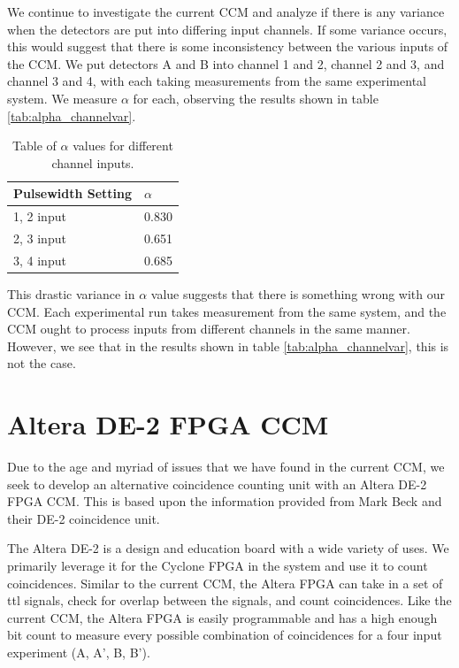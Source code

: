 \documentclass[letterpaper, 11 pt]{article}
\begin{document}
We continue to investigate the current CCM and analyze if there is any variance when the detectors
are put into differing input channels. If some variance occurs, this would suggest that there is some
inconsistency between the various inputs of the CCM. We put detectors A and B into channel 1 and 2,
channel 2 and 3, and channel 3 and 4, with each taking measurements from the same experimental system.
We measure $\alpha$ for each, observing the results shown in table \ref{tab:alpha_channelvar}.
\begin{table}[H]
    \centering
    \begin{tabular}{|l|l|}
    \hline
    \textbf{Pulsewidth Setting} & \textbf{$\alpha$} \\ \hline
    1, 2 input        & 0.830                   \\ \hline
    2, 3 input        & 0.651                   \\ \hline
    3, 4 input        & 0.685                   \\ \hline
    \end{tabular}
    \caption{Table of $\alpha$ values for different channel inputs.}
\end{table}\label{tab:alpha_channelvar}
This drastic variance in $\alpha$ value suggests that there is something wrong with our CCM.
Each experimental run takes measurement from the same system, and the CCM ought to process inputs
from different channels in the same manner. However, we see that in the results shown in table \ref{tab:alpha_channelvar},
this is not the case.

\section{Altera DE-2 FPGA CCM}

Due to the age and myriad of issues that we have found in the current CCM,
we seek to develop an alternative coincidence counting unit with an Altera DE-2 FPGA CCM.
This is based upon the information provided from Mark Beck and their DE-2 coincidence unit.

The Altera DE-2 is a design and education board with a wide variety of uses. We primarily leverage it
for the Cyclone FPGA in the system and use it to count coincidences. Similar to the current CCM,
the Altera FPGA can take in a set of ttl signals, check for overlap between the signals, and count coincidences.
Like the current CCM, the Altera FPGA is easily programmable and has a high enough bit count to measure every possible
combination of coincidences for a four input experiment (A, A', B, B').
\end{document}
